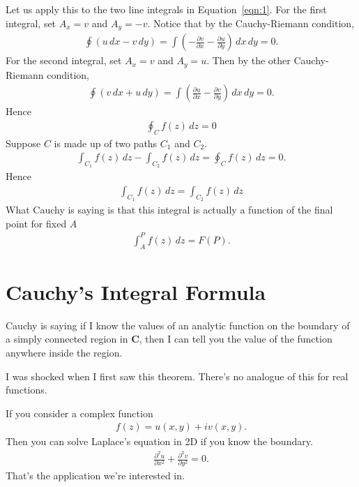 Let us apply this to the two line integrals in Equation~\ref{eqn:1}.
For the first integral,
set $A_x = v$ and $A_y = -v$.
Notice that by the Cauchy-Riemann condition,
\begin{align}
    \oint\left(
        u\,dx - v\,dy
    \right)
    =
    \int\left(
    -\frac{\partial v}{\partial x}
    - \frac{\partial u}{\partial y}
    \right)\,dx\,dy
    =0.
\end{align}
For the second integral, set
$A_x = v$ and $A_y = u$.
Then by the other Cauchy-Riemann condition,
\begin{align}
    \oint\left(
        v\,dx + u\,dy
    \right)
    =
    \int\left(
    \frac{\partial u}{\partial x}
    - \frac{\partial v}{\partial y}
    \right)\,dx\,dy
    =0.
\end{align}
Hence
\begin{align}
    \oint_C f(z)\,dz = 0
\end{align}
Suppose $C$ is made up of two paths $C_1$ and $C_2$.
\begin{align}
    \int_{C_1} f(z)\,dz
    - \int_{C_2} f(z)\,dz
    = \oint_C f(z)\,dz
    = 0.
\end{align}
Hence
\begin{align}
    \int_{C_1}f(z)\,dz
    = \int_{C_2}f(z)\,dz
\end{align}
What Cauchy is saying is that this integral is actually a function of the final
point for fixed $A$
\begin{align}
    \int_{A}^{P}f(z)\,dz = F(P).
\end{align}


\section{Cauchy's Integral Formula}
Cauchy is saying if I know the values of an analytic function on the boundary of
a simply connected region in $\mathbf{C}$,
then I can tell you the value of the function anywhere inside the region.

I was shocked when I first saw this theorem.
There's no analogue of this for real functions.

If you consider a complex function
\begin{align}
    f(z) = u(x, y) + i v(x, y).
\end{align}
Then you can solve Laplace's equation in 2D if you know the boundary.
\begin{align}
    \frac{\partial^2 u}{\partial x^2}
     + \frac{\partial^2 v}{\partial y^2}
     = 0.
\end{align}
That's the application we're interested in.


